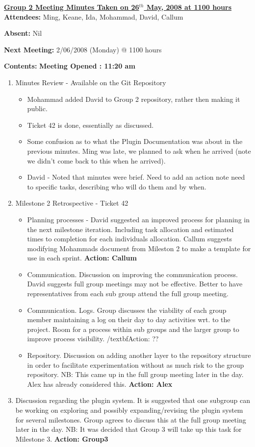 \documentclass{letter}
\begin{document}
 
{\large \textbf{\underline{Group 2 Meeting Minutes Taken on 26$^{th}$ May, 2008 at 1100 hours}}}\\
 
\textbf{Attendees:} Ming, Keane, Ida, Mohammad, David, Callum
 
\textbf{Absent:} Nil
 
\textbf{Next Meeting:} 2/06/2008 (Monday) @ 1100 hours
 
\textbf{Contents:}
 \textbf{Meeting Opened : 11:20 am }
\begin{enumerate}
\item Minutes Review - Available on the Git Repository
  \begin{itemize}
  \item Mohammad added David to Group 2 repository, rather then making it public.
  \item Ticket 42 is done, essentially as discussed.
  \item Some confusion as to what the Plugin Documentation was about in the previous minutes. Ming was late, we planned to ask when he arrived (note we didn't come back to this when he arrived).
  \item David - Noted that minutes were brief. Need to add an action note need to specific tasks, describing who will do them and by when.
  \end{itemize}
\item Milestone 2 Retrospective - Ticket 42
  \begin{itemize}
  \item Planning processes - David suggested an improved process for planning in
  the next milestone iteration. Including task allocation and estimated times to completion for each
  individuals allocation. Callum suggests modifying Mohammads document from
  Mileston 2 to make a template for use in each sprint. \textbf{Action: Callum}
  \item Communication. Discussion on improving the communication process. David
  suggests full group meetings may not be effective. Better to have
  representatives from each sub group attend the full group meeting.
  \item Communication. Logs. Group discusses the viability of each group member
  maintaining a log on their day to day activities wrt. to the project. Room for
  a process within sub groups and the larger group to improve process
  visibility. /textbf{Action: ??}
  \item Repository. Discussion on adding another layer to the repository
  structure in order to facilitate experimentation without as much risk to the
  group repository. NB: This came up in the full group meeting later in the day.
  Alex has already considered this. \textbf{Action: Alex}
    \end{itemize}
\item Discussion regarding the plugin system. It is suggested that one
  subgroup can be working on exploring and possibly expanding/revising the plugin
  system for several milestones. Group agrees to discuss this at the full group
  meeting later in the day. NB: It was decided that Group 3 will take up this
  task for Milestone 3. \textbf{Action: Group3}
\end{enumerate}
 
\end{document}
